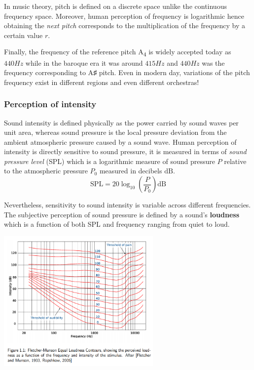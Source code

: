 \documentclass[american,]{article}
\begin{document}
In music theory, pitch is defined on a discrete space
unlike the continuous frequency space.
Moreover, human perception of frequency is logarithmic
hence obtaining the \emph{next pitch} corresponds to the
multiplication of the frequency by a certain value \(r\).

Finally, the frequency of the reference pitch A\textsubscript{4}
is widely accepted today as \(440 Hz\) while in the baroque
era it was around \(415 Hz\) and \(440 Hz\) was the frequency
corresponding to A♯ pitch.
Even in modern day, variations of the pitch frequency
exist in different regions and even different orchestras!

\hypertarget{perception-of-intensity}{%
\subsubsection{Perception of intensity}\label{perception-of-intensity}}

Sound intensity is defined physically as the power carried
by sound waves per unit area, whereas sound pressure is
the local pressure deviation from the ambient atmospheric
pressure caused by a sound wave.
Human perception of intensity is directly sensitive to
sound pressure, it is measured in terms of \emph{sound pressure level} (SPL)
which is a logarithmic measure of sound pressure \(P\)
relative to the atmospheric pressure \(P_0\) measured
in decibels \(\mathrm{dB}\).
\[\mathrm{SPL} = 20\log_{10}\left(\frac{P}{P_0}\right) \mathrm{dB}\]

Nevertheless, sensitivity to sound intensity is variable
across different frequencies.
The subjective perception of sound pressure
is defined by a sound's \textbf{loudness} which is a function of
both SPL and frequency ranging from quiet to loud.

\includegraphics[width=0.6\textwidth,height=\textheight]{img/loudness.png}
\end{document}
